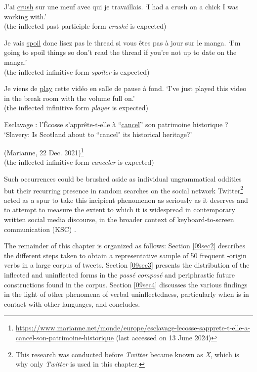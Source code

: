 \documentclass[output=paper,colorlinks,citecolor=brown]{langscibook}
\begin{document}
\begin{exe}
	\ex \label{09ex1}
	J'ai \ul{crush} sur une meuf avec qui je travaillais.
	\trans ‘I had a crush on a chick I was working with.’ \\
	\hfill (the inflected past participle form \textit{crushé} is expected)
	
	\ex \label{09ex2}
	Je vais \ul{spoil} donc lisez pas le thread si vous êtes pas à jour sur le manga.
	\trans ‘I'm going to spoil things so don't read the thread if you're not up to date on the manga.’ \\
	\hfill (the inflected infinitive form \textit{spoiler} is expected)
	
	\ex \label{09ex3}
	Je viens de \ul{play} cette vidéo en salle de pause à fond.
	\trans ‘I've just played this video in the break room with the volume full on.’ \\
	\hfill (the inflected infinitive form \textit{player} is expected)
	
	\ex \label{09ex4}
	Esclavage : l'Écosse s'apprête-t-elle à ``\ul{cancel}'' son patrimoine historique ?
	\trans ‘Slavery: Is Scotland about to ``cancel" its historical heritage?’
	
	\hfill (Marianne, 22 Dec. 2021)\footnote{\url{https://www.marianne.net/monde/europe/esclavage-lecosse-sapprete-t-elle-a-cancel-son-patrimoine-historique} (last accessed on 13 June 2024)} \\
	\hfill (the inflected infinitive form \textit{canceler} is expected)
\end{exe}

Such occurrences could be brushed aside as individual ungrammatical oddities but their recurring presence in random searches on the social network Twitter\footnote{This research was conducted before \emph{Twitter} became known as \emph{X}, which is why only \emph{Twitter} is used in this chapter.} acted as a spur to take this incipient phenomenon as seriously as it deserves and to attempt to measure the extent to which it is widespread in contemporary written social media discourse, in the broader context of keyboard-to-screen communication (KSC) \citep{juckerdurscheid2012}.

The remainder of this chapter is organized as follows: Section \ref{09sec2} describes the different steps taken to obtain a representative sample of 50 frequent -origin verbs in a large corpus of  tweets. Section \ref{09sec3} presents the distribution of the inflected and uninflected forms in the \emph{passé composé} and periphrastic future constructions found in the corpus. Section \ref{09sec4} discusses the various findings in the light of other phenomena of verbal uninflectedness, particularly when  is in contact with other languages, and concludes.
\end{document}
